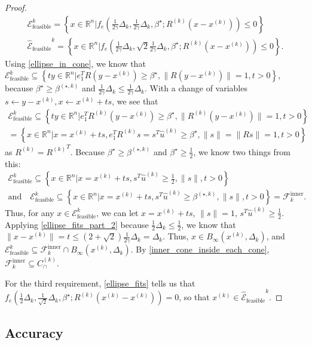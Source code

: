 \documentclass{article}
\theoremstyle{case}
\newcommand{\bs}{{\beta^{\star}}}
\newcommand{\bsk}{{\beta^{(\star, k)}}}
\newcommand{\capcones}{{C^{(k)}_{\cap}}}
\newcommand{\dk}{\Delta_k}
\newcommand{\fcki}{{\mathcal {F}^{\text{inner}}_k}}
\newcommand{\huk}{{{\hat u}^{(k)}}}
\newcommand{\Rn}{\mathbb R^n}
\newcommand{\rotk}{{R^{(k)}}}
\newcommand{\scaledunshiftedellipsoid}{{{\mathcal {\hat E}_{\text{feasible}}}^k}}
\newcommand{\tr}{{ B_{\infty}\left(\xk, \dk\right) }}
\newcommand{\unshiftedellipsoid}{{\mathcal E^k_{\text{feasible}}}}
\newcommand{\xk}{{x^{(k)}}}
\begin{document}
\begin{proof}
\begin{align*}
\unshiftedellipsoid = \left\{x \in \Rn | f_e\left(\frac 1 {2\gamma} \dk, \frac 1 {2\gamma} \dk, \bs; \rotk\left(x - \xk\right)\right) \le 0 \right\} \\
\scaledunshiftedellipsoid = \left\{x \in \Rn | f_e\left(\frac 1 {2\gamma} \dk, \sqrt{2} \frac {1}{2\gamma}\dk, \bs; \rotk\left(x - \xk\right)\right) \le 0 \right\}.
\end{align*}
Using \cref{ellipse_in_cone}, we know that $\unshiftedellipsoid \subseteq \left\{t y \in \Rn | e_1^TR\left(y - \xk\right) \ge \bs, \|R\left(y - \xk\right)\| = 1, t > 0 \right\}$,
because $\bs \ge \bsk$ and $\frac 1 {2\gamma} \dk \le \frac 1 {2\gamma} \dk$.
With a change of variables $s \gets y - \xk, x \gets \xk + t s$, we see that
\begin{align*}
\unshiftedellipsoid \subseteq \left\{t y \in \Rn | e_1^T\rotk\left(y - \xk\right) \ge \bs, \|\rotk\left(y - \xk\right)\| = 1, t > 0 \right\} \\
= \left\{x \in \Rn | x = \xk + ts, e_1^T\rotk s = s^T\huk \ge \bs, \|s\| = \|Rs\| = 1, t > 0 \right\}
\end{align*}
as $\rotk = \rotk^T$.
Because $\bs \ge \bsk$ and $\bs \ge \frac 1 2$, we know two things from this:
\begin{align*}
\unshiftedellipsoid \subseteq \left\{x \in \Rn | x = \xk + ts, s^T\huk \ge \frac 1 2, \|s\|, t > 0 \right\} \\
\textrm{and} \quad \unshiftedellipsoid \subseteq \left\{x \in \Rn | x = \xk + ts, s^T\huk \ge \bsk, \|s\|, t > 0 \right\} = \fcki.
\end{align*}
Thus, for any $x \in \unshiftedellipsoid$, we can let $x = \xk + ts$, $\|s\| = 1$, $s^T\huk \ge \frac 1 2$.
Applying \cref{ellipse_fits_part_2} because $\frac 1 2 \dk \le \frac 1 2$, we know that $\|x - \xk\| = t \le \left(2 + \sqrt{2}\right)\frac 1 {2\gamma} \dk = \dk$.
Thus, $x \in \tr$, and $\unshiftedellipsoid \subseteq \fcki \cap \tr$.
By \cref{inner_cone_inside_each_cone}, $\fcki \subseteq \capcones$.

For the third requirement, \cref{ellipse_fits} tells us that
$f_e\left(\frac 1 2 \dk, \frac 1 {\sqrt{2}}\dk, \bs; \rotk\left(\xk - \xk\right)\right) = 0$, so that $\xk \in \scaledunshiftedellipsoid$.
\end{proof}

\subsection{Accuracy}
\label{ellipsoidal_lambda}
\end{document}
